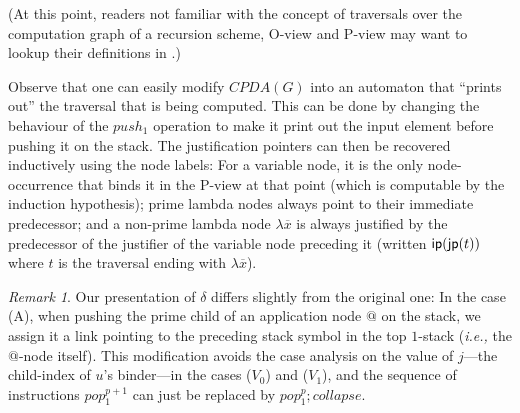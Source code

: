 \documentclass[a4paper]{article}[12pt]
\theoremstyle{remark}
\newtheorem{remark}{Remark}[section]
\theoremstyle{definition}
\begin{document}
(At this point, readers not familiar with the concept of traversals over the computation graph of a recursion scheme, O-view and P-view may want to lookup their definitions in \cite{OngLics2006}.)

Observe that one can easily modify $CPDA(G)$ into an automaton that ``prints out'' the traversal that is being computed. This can be done by changing the behaviour of the $push_1$ operation to make it print out the input element before pushing it on the stack. The justification pointers can then be recovered inductively using the node labels: For a variable node, it is the only node-occurrence that binds it in the P-view at that point (which is computable by the induction hypothesis); prime lambda nodes always point to their immediate predecessor; and a non-prime lambda node $\lambda \overline{x}$ is always justified by the predecessor of the justifier of the variable node preceding it (written ${\sf ip}({\sf jp}(t))$ where $t$ is the traversal ending with $\lambda \overline{x}$).

\begin{remark} 
Our presentation of $\delta$ differs slightly from the original one: In the case (A), when pushing the prime child of an application node $@$ on the stack, we assign it a link pointing to the preceding stack symbol in the top $1$-stack ({\it i.e.,} the $@$-node itself).
This modification avoids the case analysis on the value of $j$---the child-index of $u$'s binder---in the
cases ($V_0$) and ($V_1$), and the sequence of instructions $pop_1^{p+1}$ can just be replaced by
$pop_1^p ; collapse$. 
\end{remark}
\end{document}
